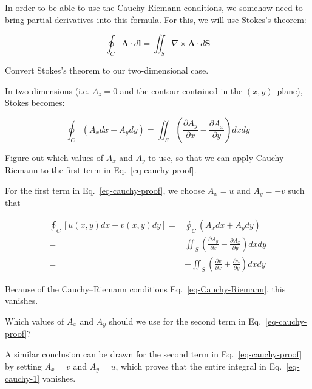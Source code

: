 In order to be able to use the Cauchy-Riemann conditions, we somehow need to bring partial derivatives into this formula. For this, we will use Stokes's theorem:

\begin{equation}
\oint_{{{C}}} {\mathbf A} \cdot d {\mathbf l} = \iint_S \nabla \times {\mathbf A} \cdot d {\mathbf S}
\end{equation}

\begin{cue}
Convert Stokes's theorem to our two-dimensional case.
\end{cue}

In two dimensions (i.e. $A_z=0$ and the contour contained in the $(x,y)$--plane), Stokes becomes:

\begin{equation}
\oint_{{C}} \left(A_x dx + A_y dy\right) = \iint_S \left(\frac{\partial
A_y}{\partial x} - \frac{\partial A_x}{\partial y} \right)dx dy
\end{equation} 

\pagebreak

\begin{cue}
Figure out which values of $A_x$ and $A_y$ to use, so that we can apply Cauchy--Riemann to the first term in Eq.~\ref{eq-cauchy-proof}.
\end{cue}

For the first term in Eq.~\ref{eq-cauchy-proof}, we choose $A_x=u$ and $A_y=-v$ such that

\begin{align}
\oint_{C}\left[u(x,y)dx-v(x,y)dy\right] =& \oint_{{C}} \left(A_x dx + A_y dy\right) \nonumber \\
=& \iint_S \left(\frac{\partial A_y}{\partial x} - \frac{\partial A_x}{\partial y} \right)dx dy \nonumber \\ =& -\iint_S \left(\frac{\partial v}{\partial x} + \frac{\partial u}{\partial y} \right)dx dy 
\end{align} 

Because of the Cauchy--Riemann conditions Eq.~\ref{eq-Cauchy-Riemann}, this
vanishes.

\begin{cue}
Which values of $A_x$ and $A_y$ should we use for the second term in Eq.~\ref{eq-cauchy-proof}?
\end{cue}

A similar conclusion can be drawn for the second term in Eq.~\ref{eq-cauchy-proof} by setting $A_x=v$ and $A_y=u$, which proves that the entire integral in Eq.~\ref{eq-cauchy-1} vanishes.

